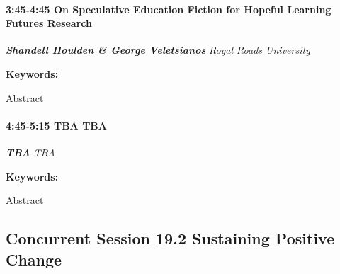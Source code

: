 \documentclass[
]{book}
\begin{document}
\begin{session}
\hypertarget{on-speculative-education-fiction-for-hopeful-learning-futures-research}{%
\paragraph*{\texorpdfstring{3:45-4:45 \textbar{} \textbf{On Speculative
Education Fiction for Hopeful Learning Futures} \textbar{}
Research}{3:45-4:45 \textbar{} On Speculative Education Fiction for Hopeful Learning Futures \textbar{} Research}}\label{on-speculative-education-fiction-for-hopeful-learning-futures-research}}

\textbf{\emph{Shandell Houlden \& George Veletsianos}} \textbar{}
\emph{Royal Roads University}

\textbf{Keywords:}

Abstract
\end{session}

\begin{session}
\hypertarget{tba-tba}{%
\paragraph*{\texorpdfstring{4:45-5:15 \textbar{} \textbf{TBA} \textbar{}
TBA}{4:45-5:15 \textbar{} TBA \textbar{} TBA}}\label{tba-tba}}

\textbf{\emph{TBA}} \textbar{} \emph{TBA}

\textbf{Keywords:}

Abstract
\end{session}

\hypertarget{concurrent-session-19.2-sustaining-positive-change}{%
\subsection*{Concurrent Session 19.2 \textbar{} Sustaining Positive Change}\label{concurrent-session-19.2-sustaining-positive-change}}
\end{document}
